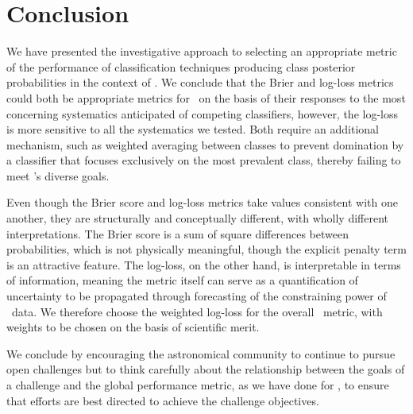 \section{Conclusion}
\label{sec:conclusion}

We have presented the investigative approach to selecting an appropriate metric of the performance of classification techniques producing class posterior probabilities in the context of \plasticc.
We conclude that the Brier and log-loss metrics could both be appropriate metrics for \plasticc\ on the basis of their responses to the most concerning systematics anticipated of competing classifiers, however, the log-loss is more sensitive to all the systematics we tested.
Both require an additional mechanism, such as weighted averaging between classes to prevent domination by a classifier that focuses exclusively on the most prevalent class, thereby failing to meet \plasticc's diverse goals.

Even though the Brier score and log-loss metrics take values consistent with one another, they are structurally and conceptually different, with wholly different interpretations.
The Brier score is a sum of square differences between probabilities, which is not physically meaningful, though the explicit penalty term is an attractive feature.
The log-loss, on the other hand, is interpretable in terms of information, meaning the metric itself can serve as a quantification of uncertainty to be propagated through forecasting of the constraining power of \lsst\ data.
We therefore choose the weighted log-loss for the overall \plasticc\ metric, with weights to be chosen on the basis of scientific merit.

We conclude by encouraging the astronomical community to continue to pursue open challenges but to think carefully about the relationship between the goals of a challenge and the global performance metric, as we have done for \plasticc, to ensure that efforts are best directed to achieve the challenge objectives.
